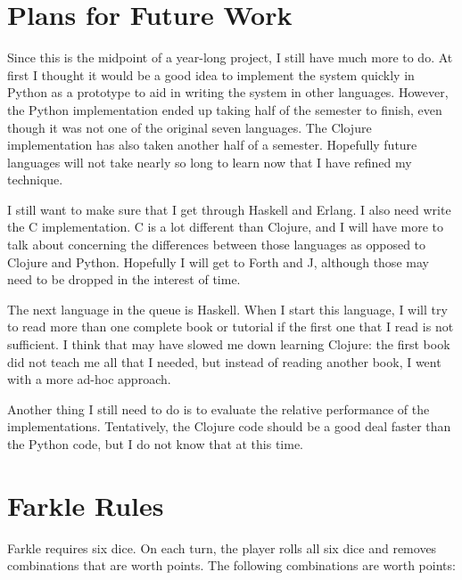 \documentclass{article}
\begin{document}
\section{Plans for Future Work}

Since this is the midpoint of a year-long project, I still have much more
to do.  At first I thought it would be a good idea to implement the system
quickly in Python as a prototype to aid in writing the system in other
languages.  However, the Python implementation ended up taking half of the
semester to finish, even though it was not one of the original seven languages.
The Clojure implementation has also taken another half of a semester.
Hopefully future languages will not take nearly so long to learn now that I
have refined my technique.

I still want to make sure that I get through Haskell and Erlang.  I also need
write the C implementation.  C is a lot different than Clojure, and I will have
more to talk about concerning the differences between those languages as opposed
to Clojure and Python.  Hopefully I will get to Forth and J, although those may
need to be dropped in the interest of time.

The next language in the queue is Haskell.  When I start this language, I will
try to read more than one complete book or tutorial if the first one that I
read is not sufficient.  I think that may have slowed me down learning Clojure:
the first book did not teach me all that I needed, but instead of reading
another book, I went with a more ad-hoc approach.

Another thing I still need to do is to evaluate the relative performance of
the implementations.  Tentatively, the Clojure code should be a good deal
faster than the Python code, but I do not know that at this time.




\appendix
\section{Farkle Rules}
\label{sec:farklerules}

Farkle requires six dice.  On each turn, the player rolls all six dice and
removes combinations that are worth points.  The following combinations are
worth points:
\end{document}

